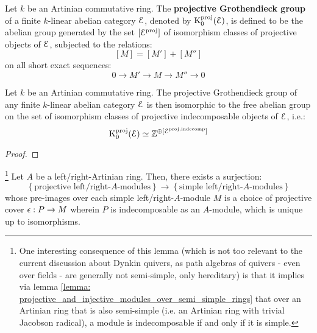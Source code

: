             \begin{definition} \label{def: projective_grothendieck_groups}
                Let $k$ be an Artinian commutative ring. The \textbf{projective Grothendieck group} of a finite $k$-linear abelian category $\mathcal{E}$, denoted by $\mathrm{K}_0^{\mathrm{proj}}(\mathcal{E})$, is defined to be the abelian group generated by the set $[\mathcal{E}^{\mathrm{proj}}]$ of isomorphism classes of projective objects of $\mathcal{E}$, subjected to the relations:
                    $$[M] = [M'] + [M'']$$
                on all short exact sequences:
                    $$0 \to M' \to M \to M'' \to 0$$
            \end{definition}
            \begin{proposition} \label{prop: projective_grothendieck_groups_are_free_on_projecitve_indecomposable_objects}
                Let $k$ be an Artinian commutative ring. The projective Grothendieck group of any finite $k$-linear abelian category $\mathcal{E}$ is then isomorphic to the free abelian group on the set of isomorphism classes of projective indecomposable objects of $\mathcal{E}$, i.e.:
                    $$\mathrm{K}_0^{\mathrm{proj}}(\mathcal{E}) \simeq \mathbb{Z}^{\oplus [\mathcal{E}^{\mathrm{proj}, \mathrm{indecomp}}]}$$
            \end{proposition}
                \begin{proof}
                    
                \end{proof}
            \begin{lemma} \label{lemma: projective_indecomposable_modules_over_artinian_algebras_are_simple}
                \footnote{One interesting consequence of this lemma (which is not too relevant to the current discussion about Dynkin quivers, as path algebras of quivers - even over fields - are generally not semi-simple, only hereditary) is that it implies via lemma \ref{lemma: projective_and_injective_modules_over_semi_simple_rings} that over an Artinian ring that is also semi-simple (i.e. an Artinian ring with trivial Jacobson radical), a module is indecomposable if and only if it is simple.} Let $A$ be a left/right-Artinian ring. Then, there exists a surjection:
                    $$
                        \left\{\text{projective left/right-$A$-modules}\right\}
                        \to
                        \left\{\text{simple left/right-$A$-modules}\right\}
                    $$
                whose pre-images over each simple left/right-$A$-module $M$ is a choice of projective cover $\epsilon: P \to M$ wherein $P$ is indecomposable as an $A$-module, which is unique up to isomorphisms. 
            \end{lemma}
